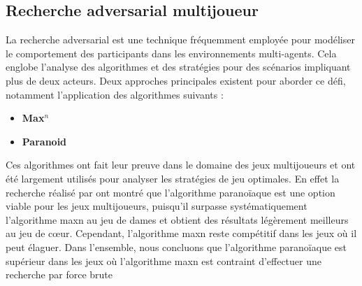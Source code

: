 \tocless\subsection{Recherche adversarial multijoueur}
La recherche adversarial est une technique fréquemment employée pour modéliser le comportement des participants dans les 
environnements multi-agents. Cela englobe l'analyse des algorithmes et des stratégies pour des scénarios 
impliquant plus de deux acteurs. Deux approches principales existent pour aborder ce défi, notamment l'application des algorithmes suivants : 
\begin{itemize}
	\item \textbf{Max}$^n$
	\item \textbf{Paranoid}
\end{itemize}
Ces algorithmes ont fait leur preuve dans le domaine des jeux multijoueurs
et ont été largement utilisés pour analyser les stratégies de jeu optimales. En effet la recherche réalisé par \cite{nathan} ont montré que l'algorithme paranoïaque 
est une option viable pour les jeux multijoueurs, puisqu'il surpasse systématiquement l'algorithme maxn au jeu de dames et obtient des résultats légèrement meilleurs au jeu de cœur. Cependant, l'algorithme maxn reste compétitif dans les jeux où il peut élaguer. Dans l'ensemble, nous concluons que l'algorithme paranoïaque est supérieur dans les jeux où l'algorithme maxn est contraint d'effectuer une recherche par force brute
